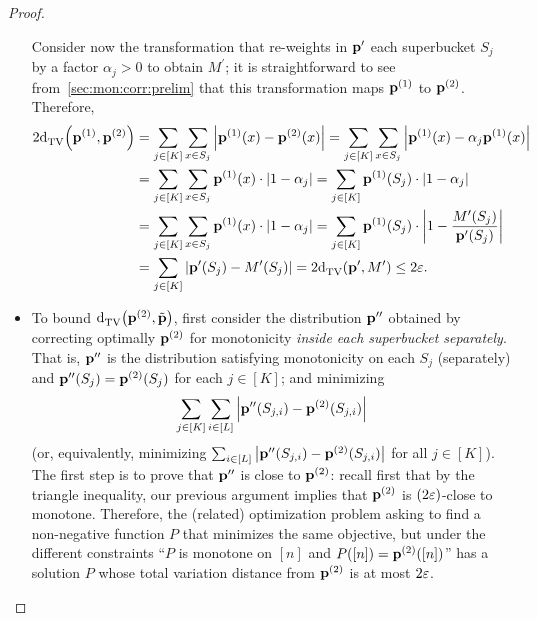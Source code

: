 \begin{proof}
\begin{itemize}
Consider now the transformation that re-weights in $\mathbf{p}^\prime$ each superbucket $S_j$ by a factor $\alpha_j > 0$ to obtain $M^\prime$; it is straightforward to see from~\cref{sec:mon:corr:prelim} that this transformation maps $\mathbf{p}^{(1)}$ to $\mathbf{p}^{(2)}$. Therefore,
\begin{align*}
2{\operatorname{d}_{\textrm{TV}}^{}\!\left({\mathbf{p}^{(1)}, \mathbf{p}^{(2)}}\right)} &= \sum_{j\in [K]} \sum_{x\in S_j} \left\lvert  \mathbf{p}^{(1)}(x) - \mathbf{p}^{(2)}(x)  \right\rvert = \sum_{j\in [K]} \sum_{x\in S_j} \left\lvert  \mathbf{p}^{(1)}(x) - \alpha_j\mathbf{p}^{(1)}(x)  \right\rvert \\
&= \sum_{j\in [K]} \sum_{x\in S_j}  \mathbf{p}^{(1)}(x)\cdot \left\lvert  1 - \alpha_j  \right\rvert= \sum_{j\in [K]}  \mathbf{p}^{(1)}(S_j)\cdot \left\lvert  1 - \alpha_j  \right\rvert \\
&= \sum_{j\in [K]} \sum_{x\in S_j}  \mathbf{p}^{(1)}(x)\cdot \left\lvert  1 - \alpha_j  \right\rvert= \sum_{j\in [K]}  \mathbf{p}^{(1)}(S_j)\cdot \left\lvert  1 - \frac{M^\prime(S_j)}{\mathbf{p}^\prime(S_j)}  \right\rvert \\
&= \sum_{j\in [K]} \left\lvert  \mathbf{p}^\prime(S_j) - M^\prime(S_j) \right\rvert = 2{\operatorname{d}_{\textrm{TV}}^{}\!\left({\mathbf{p}^\prime, M^\prime}\right)} \leq 2\varepsilon.
\end{align*}
  \item To bound ${\operatorname{d}_{\textrm{TV}}^{}\!\left({\mathbf{p}^{(2)}, \tilde{\mathbf{p}}}\right)}$, first consider the distribution $\mathbf{p}^{\prime\prime}$  obtained by correcting optimally $\mathbf{p}^{(2)}$ for monotonicity \emph{inside each superbucket separately}. That is, $\mathbf{p}^{\prime\prime}$ is the distribution satisfying
  monotonicity on each $S_j$ (separately) and $\mathbf{p}^{\prime\prime}(S_j) = \mathbf{p}^{(2)}(S_j)$ for each $j\in [K]$;
    and minimizing 
    \[
      \sum_{j\in[K]} \sum_{i\in [L]} \left\lvert  \mathbf{p}^{\prime\prime}(S_{j,i}) - \mathbf{p}^{(2)}(S_{j,i})  \right\rvert 
    \]
  (or, equivalently, minimizing $\sum_{i\in [L]} \left\lvert  \mathbf{p}^{\prime\prime}(S_{j,i}) - \mathbf{p}^{(2)}(S_{j,i})  \right\rvert$ for all $j\in[K]$). The first step is to prove that $\mathbf{p}^{\prime\prime}$ is close to $\mathbf{p}^{(2)}$: recall first that by the triangle inequality, our previous argument implies that $\mathbf{p}^{(2)}$ is $(2\varepsilon)$-close to monotone. Therefore, the (related) optimization problem asking to find a non-negative function $P$ that minimizes the same objective, but under the different constraints ``$P$ is monotone on $[n]$ and $P([n]) = \mathbf{p}^{(2)}([n])$'' has a solution $P$ whose total variation distance from $\mathbf{p}^{(2)}$ is at most $2\varepsilon$.
  

\end{itemize}
\end{proof}
